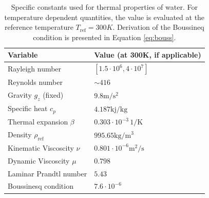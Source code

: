 \documentclass[12pt]{report}
\newcommand{\rhoref}{\rho_{\text{ref}}}
\begin{document}
\begin{table}[h]
\caption[Specific constants used for thermal properties of water]{
  Specific constants used for thermal properties of water.
  For temperature dependent quantities, the value is evaluated at the reference temperature $T_\text{ref}  = 300K$.
  Derivation of the Boussineq condition is presented in Equation \ref{eq:bouss}.
  }
\begin{center}
\begin{tabular}{ll}
\hline
Variable & Value (at 300K, if applicable)\\
\hline
\hline
Rayleigh number & $[1.5\cdot 10^6, 4\cdot 10^7]$\\
\hline
Reynolds number & $\sim 416$\\
\hline
Gravity $g_z$ (fixed) & $9.8 \text{m}/\text{s}^2$\\
\hline
Specific heat $c_p$ & $4.187 \text{kj}/\text{kg}$\\
\hline
Thermal expansion $\beta$ & $0.303\cdot 10^{-3} \,1/\text{K}$\\
\hline
Density $\rhoref$ & $995.65 \text{kg}/\text{m}^3$\\
\hline
Kinematic Viscoscity $\nu$ & $0.801\cdot 10^{-6} \text{m}^2/\text{s}$\\
\hline
Dynamic Viscoscity $\mu$ & $0.798$\\
\hline
Laminar Prandtl number & $5.43$\\
\hline
Boussinesq condition & $7.6\cdot 10^{-6}$\\
\hline
\end{tabular}
\label{tb:flowvariables}
\end{center}
\end{table}
\end{document}

